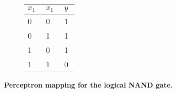 \begin{figure}[!htp]
    \centering
    \begin{subfigure}[b]{0.70\textwidth}
        \centering
        
        \captionsetup{format=hang} %
        \label{fig:perceptron:nand:mapping}
    \end{subfigure}\hfil
    \begin{subfigure}[b]{0.29\textwidth}
        \centering
        \renewcommand{\arraystretch}{1.5}
        \begin{tabular}{C{0.1\linewidth}C{0.1\linewidth}|C{0.1\linewidth}}
            \hline
            $x_1$ & $x_1$ & $y$ \\      & 0     & 1   \\
            0     & 1     & 1   \\
            1     & 0     & 1   \\
            1     & 1     & 0
        \end{tabular}
        \vspace{0.5cm}
        \label{fig:perceptron:nand:truth}
    \end{subfigure}\hfil
    \captionsetup{format=hang} %
    \caption{
        \textbf{Perceptron mapping for the logical NAND gate.}
    }
    \label{fig:perceptron:nand}
\end{figure}




